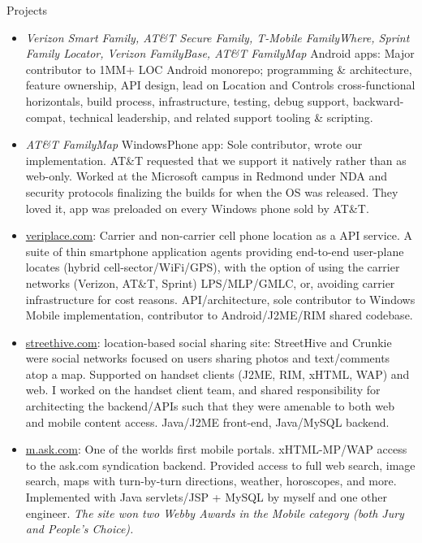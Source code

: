 
\medskip
\bigskip


\begin{bf} \large
Projects
\end{bf}
	   	   
	   \begin{itemize}
		\item 
		{\em Verizon Smart Family,
		AT\&T Secure Family, 
		T-Mobile FamilyWhere,
		Sprint Family Locator,
		Verizon FamilyBase,
		AT\&T FamilyMap} Android apps: 
		Major contributor to 1MM+ LOC Android monorepo; programming \& architecture, 
		feature ownership, API design, lead on Location and Controls 
		cross-functional horizontals, build process, infrastructure, testing, debug support, backward-compat,
		technical leadership, and related support tooling \& scripting. \\[-16pt]
		
		\item {\em  AT\&T FamilyMap} WindowsPhone app: Sole contributor, wrote our 
			implementation. AT\&T requested that we support it natively rather than as web-only. 
			Worked at the Microsoft campus in Redmond under NDA and security protocols
			finalizing the builds for when the OS was released.
			They loved it, app was preloaded on every Windows phone sold by AT\&T. \\[-16pt]

		\item \url{veriplace.com}: Carrier and non-carrier cell phone location as a API service. 
		A suite of thin smartphone application agents providing
		end-to-end user-plane locates (hybrid cell-sector/WiFi/GPS), with the option of using the 
		carrier networks (Verizon, AT\&T, Sprint) LPS/MLP/GMLC, or, avoiding carrier infrastructure for cost reasons.
		API/architecture, sole contributor to Windows Mobile implementation, contributor to Android/J2ME/RIM
		shared codebase.

		\item \url{streethive.com}: location-based social sharing site: StreetHive and Crunkie were social networks 
		focused on users sharing photos and text/comments atop a map. Supported on 
		handset clients (J2ME, RIM, xHTML, WAP) and web.  
		I worked on the handset client team, and shared responsibility for architecting the backend/APIs such that
		they were amenable to both web and 
		mobile content access. Java/J2ME front-end, Java/MySQL backend.

		\item \url{m.ask.com}: One of the worlds first mobile portals.  xHTML-MP/WAP access to the ask.com
		syndication backend. Provided access to full web search, 
		image search, maps with turn-by-turn directions, weather, horoscopes, and more. 
		Implemented with Java servlets/JSP + MySQL 
		by myself and one other engineer.  {\em The site won two Webby Awards in the Mobile category 
		(both Jury and People's Choice).}


\end{itemize}
